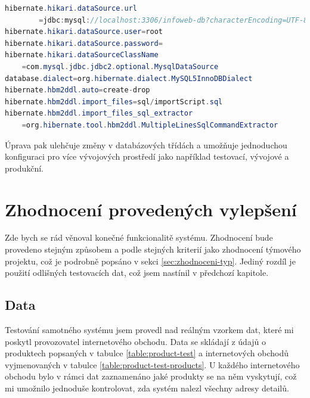 \documentclass[thesis=B,czech]{FITthesis}[2012/06/26]
\begin{document}
\begin{lstlisting}[language=Java, caption={Nastavení připojení do databáze.}]
hibernate.hikari.dataSource.url
		=jdbc:mysql://localhost:3306/infoweb-db?characterEncoding=UTF-8
hibernate.hikari.dataSource.user=root
hibernate.hikari.dataSource.password=
hibernate.hikari.dataSourceClassName
	=com.mysql.jdbc.jdbc2.optional.MysqlDataSource
database.dialect=org.hibernate.dialect.MySQL5InnoDBDialect
hibernate.hbm2ddl.auto=create-drop
hibernate.hbm2ddl.import_files=sql/importScript.sql
hibernate.hbm2ddl.import_files_sql_extractor
	=org.hibernate.tool.hbm2ddl.MultipleLinesSqlCommandExtractor
\end{lstlisting}

Úprava pak ulehčuje změny v databázových třídách a umožňuje jednoduchou konfiguraci pro více vývojových prostředí jako například testovací, vývojové
a produkční.


\chapter{Zhodnocení provedených vylepšení}
Zde bych se rád věnoval konečné funkcionalitě systému. Zhodnocení bude provedeno stejným způsobem a podle stejných kriterií jako zhodnocení
týmového projektu, což je podrobně popsáno v sekci \ref{sec:zhodnoceni-typ}. Jediný rozdíl je použití odlišných testovacích dat, což jsem nastínil v předchozí kapitole.


\section{Data}
Testování samotného systému jsem provedl nad reálným vzorkem dat, které mi poskytl provozovatel internetového obchodu.
Data se skládají z údajů o produktech popsaných v tabulce \ref{table:product-test} a internetových obchodů vyjmenovaných v tabulce
\ref{table:product-test-products}.
U každého internetového obchodu bylo v rámci dat zaznamenáno jaké produkty se na něm vyskytují, což mi umožnilo jednoduše kontrolovat, zda systém nalezl všechny adresy detailů.
\end{document}

